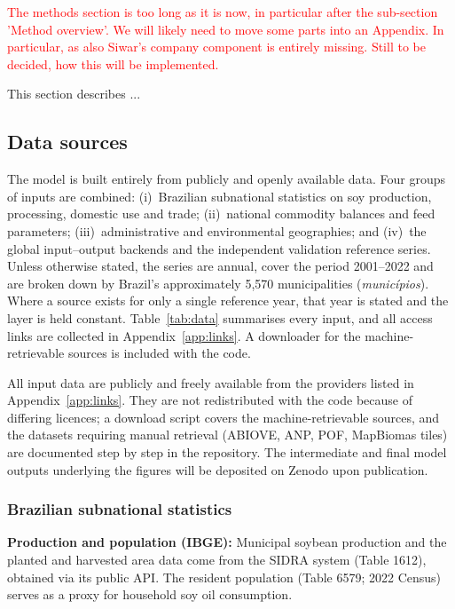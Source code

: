 \documentclass[pdflatex,sn-nature]{sn-jnl}%
\begin{document}
\textcolor{red}{The methods section is too long as it is now, in particular after the sub-section 'Method overview'. We will likely need to move some parts into an Appendix. In particular, as also Siwar's company component is entirely missing. Still to be decided, how this will be implemented.}

This section describes ...

\subsection{Data sources}

The model is built entirely from publicly and openly available data. Four
groups of inputs are combined: (i)~Brazilian subnational statistics on soy
production, processing, domestic use and trade; (ii)~national commodity
balances and feed parameters; (iii)~administrative and environmental
geographies; and (iv)~the global input--output backends and the independent
validation reference series. Unless otherwise stated, the series are annual, cover the period 2001–2022 and are broken down by Brazil's approximately 5,570 municipalities
(\emph{munic\'ipios}). Where a source exists for only a single reference
year, that year is stated and the layer is held constant.
Table~\ref{tab:data} summarises every input, and all access links are collected
in Appendix~\ref{app:links}. A downloader for the machine-retrievable
sources is included with the code.

All input data are publicly and freely available from the providers listed
in Appendix~\ref{app:links}. They are not redistributed with the code
because of differing licences; a download script covers the
machine-retrievable sources, and the datasets requiring manual retrieval
(ABIOVE, ANP, POF, MapBiomas tiles) are documented step by step in the
repository. The intermediate and final model outputs underlying the figures
will be deposited on Zenodo upon publication.

\subsubsection{Brazilian subnational statistics}\label{subsec:brazil}

\textbf{Production and population (IBGE):} Municipal soybean production and the planted and harvested area data come from the SIDRA system (Table 1612), obtained via its public API. The resident population (Table 6579; 2022 Census) serves as a proxy for household soy oil consumption.
\end{document}
